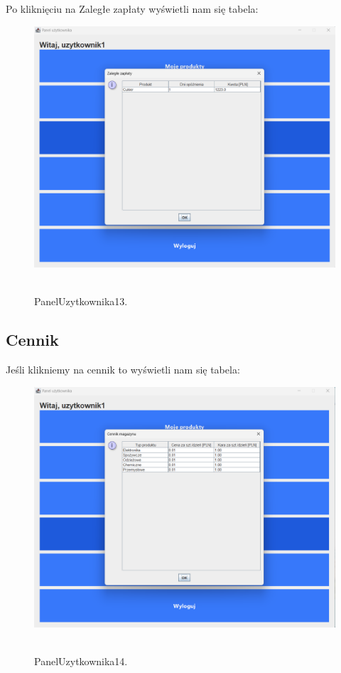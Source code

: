 Po kliknięciu na Zaległe zapłaty wyświetli nam się tabela:

\begin{figure}[H]
    \centering
    \includegraphics[width=.9\linewidth]{figures/PanelUzytkownika13.png}\
    \caption{PanelUzytkownika13.\label{PanelUzytkownika13}}
\end{figure}

\subsection{Cennik}
\label{subsec:Cennik}

Jeśli klikniemy na cennik to wyświetli nam się tabela:

\begin{figure}[H]
    \centering
    \includegraphics[width=.9\linewidth]{figures/PanelUzytkownika14.png}\
    \caption{PanelUzytkownika14.\label{PanelUzytkownika14}}
\end{figure}

